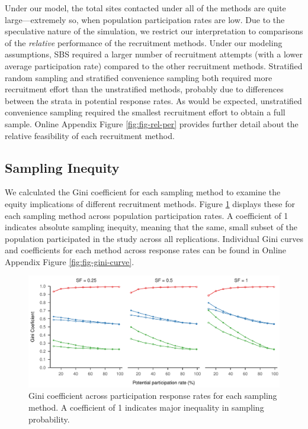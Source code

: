 \documentclass[
  man,floatsintext]{apa6}
\begin{document}
Under our model, the total sites contacted under all of the methods are quite large---extremely so, when population participation rates are low. Due to the speculative nature of the simulation, we restrict our interpretation to comparisons of the \emph{relative} performance of the recruitment methods. Under our modeling assumptions, SBS required a larger number of recruitment attempts (with a lower average participation rate) compared to the other recruitment methods. Stratified random sampling and stratified convenience sampling both required more recruitment effort than the unstratified methods, probably due to differences between the strata in potential response rates.
As would be expected, unstratified convenience sampling required the smallest recruitment effort to obtain a full sample. Online Appendix Figure \ref{fig:fig-rel-per} provides further detail about the relative feasibility of each recruitment method.

\hypertarget{sampling-inequity-1}{%
\subsection*{Sampling Inequity}\label{sampling-inequity-1}}

We calculated the Gini coefficient for each sampling method to examine the equity implications of different recruitment methods. Figure \ref{fig:fig-gini} displays these for each sampling method across population participation rates. A coefficient of 1 indicates absolute sampling inequity, meaning that the same, small subset of the population participated in the study across all replications.
Individual Gini curves and coefficients for each method across response rates can be found in Online Appendix Figure \ref{fig:fig-gini-curve}.



\begin{figure}
\centering
\includegraphics{6---Paper_files/figure-latex/fig-gini-1.pdf}
\caption{\label{fig:fig-gini}Gini coefficient across participation response rates for each sampling method. A coefficient of 1 indicates major inequality in sampling probability.}
\end{figure}
\end{document}
